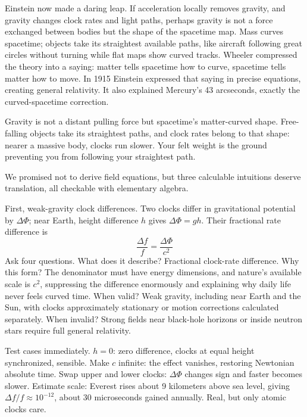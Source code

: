 \begin{mainline}
Einstein now made a daring leap. If acceleration locally removes gravity, and gravity changes clock rates and light paths, perhaps gravity is not a force exchanged between bodies but the shape of the spacetime map. Mass curves spacetime; objects take its straightest available paths, like aircraft following great circles without turning while flat maps show curved tracks. Wheeler compressed the theory into a saying: matter tells spacetime how to curve, spacetime tells matter how to move. In 1915 Einstein expressed that saying in precise equations, creating general relativity. It also explained Mercury's 43 arcseconds, exactly the curved-spacetime correction.
\end{mainline}


\begin{oneline}
Gravity is not a distant pulling force but spacetime's matter-curved shape. Free-falling objects take its straightest paths, and clock rates belong to that shape: nearer a massive body, clocks run slower. Your felt weight is the ground preventing you from following your straightest path.
\end{oneline}


\begin{mainline}
We promised not to derive field equations, but three calculable intuitions deserve translation, all checkable with elementary algebra.

First, weak-gravity clock differences. Two clocks differ in gravitational potential by \(\Delta\Phi\); near Earth, height difference \(h\) gives \(\Delta\Phi=gh\). Their fractional rate difference is
\[
\frac{\Delta f}{f}=\frac{\Delta\Phi}{c^{2}}
\]
Ask four questions. What does it describe? Fractional clock-rate difference. Why this form? The denominator must have energy dimensions, and nature's available scale is \(c^{2}\), suppressing the difference enormously and explaining why daily life never feels curved time. When valid? Weak gravity, including near Earth and the Sun, with clocks approximately stationary or motion corrections calculated separately. When invalid? Strong fields near black-hole horizons or inside neutron stars require full general relativity.

Test cases immediately. \(h=0\): zero difference, clocks at equal height synchronized, sensible. Make \(c\) infinite: the effect vanishes, restoring Newtonian absolute time. Swap upper and lower clocks: \(\Delta\Phi\) changes sign and faster becomes slower. Estimate scale: Everest rises about 9 kilometers above sea level, giving \(\Delta f/f\approx10^{-12}\), about 30 microseconds gained annually. Real, but only atomic clocks care.
\end{mainline}

